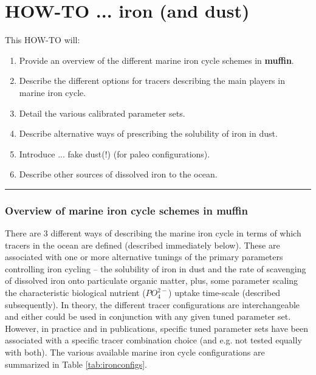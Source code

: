 
\section{HOW-TO ...  iron (and dust)}

This HOW-TO will:
\vspace{1mm}
\begin{enumerate}[noitemsep]
\item Provide an overview of the different marine iron cycle schemes in \textbf{muffin}.
\item Describe the different options  for tracers describing the main players in marine iron cycle.
\item Detail the various calibrated parameter sets.
\item Describe alternative ways of prescribing the solubility of iron in dust.
\item Introduce ... fake dust(!) (for paleo configurations).
\item Describe other sources of dissolved iron to the ocean.
\end{enumerate}

%
\noindent\rule{4cm}{0.5pt}
\subsubsection{Overview of  marine iron cycle schemes in muffin}
\vspace{1mm}

There are 3 different ways of describing the marine iron cycle in terms of which tracers in the ocean are defined (described immediately below). These are associated with one or more alternative tunings of the primary parameters controlling iron cycling -- the solubility of iron in dust and the rate of scavenging of dissolved iron onto particulate organic matter, plus, some parameter scaling the characteristic biological nutrient (\(PO^{2-}_{4}\)) uptake time-scale (described subsequently). In theory, the different tracer configurations are interchangeable and either could be used in conjunction with any given tuned parameter set. However, in practice and in publications, specific tuned parameter sets have been associated with a specific tracer combination choice (and e.g. not tested equally with both). The various available marine iron cycle configurations are summarized in Table \ref{tab:ironconfigs}.

